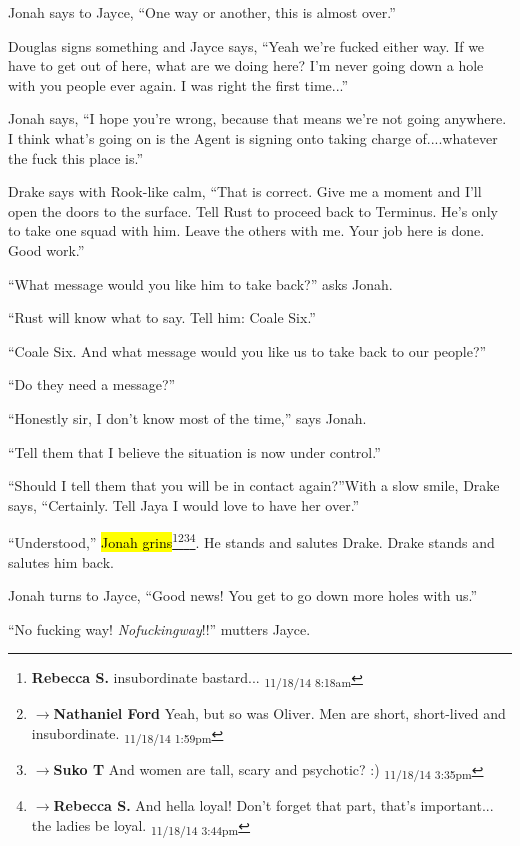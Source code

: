 Jonah says to Jayce, ``One way or another, this is almost over.''

Douglas signs something and Jayce says, ``Yeah we're fucked either way.  If we have to get out of here, what are we doing here?  I'm never going down a hole with you people ever again.  I was right the first time...''

Jonah says, ``I hope you're wrong, because that means we're not going anywhere.  I think what's going on is the Agent is signing onto taking charge of....whatever the fuck this place is.''

Drake says with Rook-like calm, ``That is correct.  Give me a moment and I'll open the doors to the surface.  Tell Rust to proceed back to Terminus.  He's only to take one squad with him.  Leave the others with me.  Your job here is done.  Good work.''

``What message would you like him to take back?'' asks Jonah.

``Rust will know what to say.  Tell him: Coale Six.''

``Coale Six.  And what message would you like us to take back to our people?''

``Do they need a message?''

``Honestly sir, I don't know most of the time,'' says Jonah.

``Tell them that I believe the situation is now under control.''

``Should I tell them that you will be in contact again?''With a slow smile, Drake says, ``Certainly.  Tell Jaya I would love to have her over.''

``Understood,'' \hl{Jonah grins}\footnote{\textbf{Rebecca S. }insubordinate bastard... \textsubscript{11/18/14 8:18am}}\footnote{$\rightarrow$\textbf{Nathaniel Ford }Yeah, but so was Oliver. Men are short, short-lived and insubordinate. \textsubscript{11/18/14 1:59pm}}\footnote{$\rightarrow$\textbf{Suko T }And women are tall, scary and psychotic? :) \textsubscript{11/18/14 3:35pm}}\footnote{$\rightarrow$\textbf{Rebecca S. }And hella loyal! Don't forget that part, that's important... the ladies be loyal. \textsubscript{11/18/14 3:44pm}}.  He stands and salutes Drake.  Drake stands and salutes him back.



Jonah turns to Jayce, ``Good news!  You get to go down more holes with us.''

``No fucking way!  \textit{Nofuckingway}!!'' mutters Jayce.




